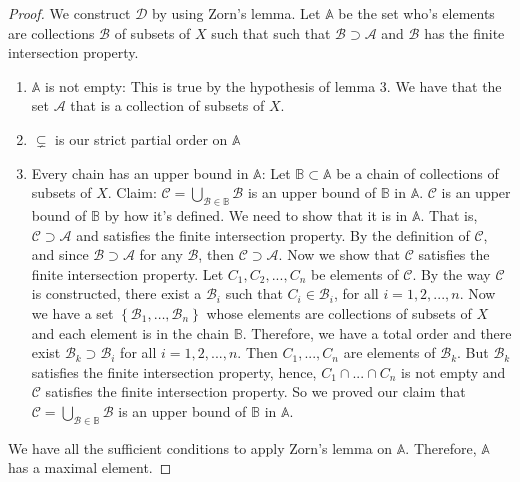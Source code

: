 \documentclass{article}
\theoremstyle{definition}
\begin{document}
\begin{proof}
We construct $\mathscr{D}$ by using Zorn's lemma. Let $\mathbb{A}$  be the set who's elements are collections $\mathcal{B}$ of subsets of $X$ such that such that $\mathcal{B} \supset \mathcal{A}$ and $\mathcal{B}$ has the finite intersection property.

\begin{enumerate}
    \item $\mathbb{A}$ is not empty: This is true by the hypothesis of lemma 3. We have that the set $\mathcal{A}$ that is a collection of subsets of $X$.
    \item $\subsetneq$ is our strict partial order on $\mathbb{A}$
    \item Every chain has an upper bound in $\mathbb{A}$: Let $\mathbb{B} \subset \mathbb{A}$  be a chain of collections of subsets of $X$. Claim: $
\mathcal{C}=\bigcup_{\mathcal{B} \in \mathbb{B}} \mathcal{B}
$ is an upper bound of $\mathbb{B}$ in $\mathbb{A}$. $\mathcal{C}$ is an upper bound of $\mathbb{B}$ by how it's defined. We need to show that it is in $\mathbb{A}$. That is, $\mathcal{C} \supset \mathcal{A}$ and satisfies the finite intersection property. By the definition of $\mathcal{C}$, and since $\mathcal{B} \supset \mathcal{A}$ for any $\mathcal{B}$, then $\mathcal{C} \supset \mathcal{A}$. Now we show that $\mathcal{C}$ satisfies the finite intersection property. Let $C_1, C_2, ..., C_n$ be elements of $\mathcal{C}$. By the way $\mathcal{C}$ is constructed, there exist a $\mathcal{B}_{i}$ such that $C_i \in \mathcal{B}_{i}$, for all $i=1, 2, ..., n$. Now we have a set $\left\{\mathscr{B}_{1}, \ldots, \mathscr{B}_{n}\right\}$ whose elements are collections of subsets of $X$ and each element is in the chain $\mathbb{B}$. Therefore, we have a total order and there exist $\mathcal{B}_{k} \supset \mathcal{B}_{i}$ for all $i=1,2,..., n$. Then $C_1,..., C_n$ are elements of $\mathcal{B}_{k}$. But $\mathcal{B}_{k}$ satisfies the finite intersection property, hence, $C_1 \cap...\cap C_n$ is not empty and $\mathcal{C}$ satisfies the finite intersection property. So we proved our claim that $
\mathcal{C}=\bigcup_{\mathcal{B} \in \mathbb{B}} \mathcal{B}
$ is an upper bound of $\mathbb{B}$ in $\mathbb{A}$.
\end{enumerate}
We have all the sufficient conditions to apply Zorn's lemma on $\mathbb{A}$. Therefore, $\mathbb{A}$ has a maximal element. 


\end{proof}
\end{document}
